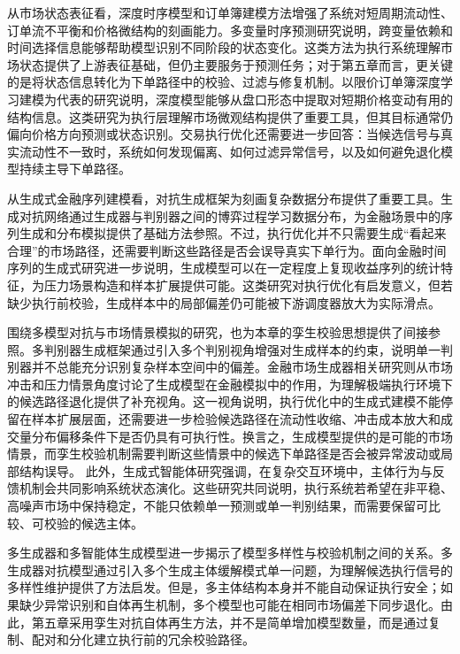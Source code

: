 从市场状态表征看，深度时序模型和订单簿建模方法增强了系统对短周期流动性、订单流不平衡和价格微结构的刻画能力。多变量时序预测研究说明，跨变量依赖和时间选择信息能够帮助模型识别不同阶段的状态变化\cite{lim2021temporal}。这类方法为执行系统理解市场状态提供了上游表征基础，但仍主要服务于预测任务；对于第五章而言，更关键的是将状态信息转化为下单路径中的校验、过滤与修复机制。以限价订单簿深度学习建模为代表的研究说明，深度模型能够从盘口形态中提取对短期价格变动有用的结构信息\cite{zhang2019DeepLOB}。这类研究为执行层理解市场微观结构提供了重要工具，但其目标通常仍偏向价格方向预测或状态识别。交易执行优化还需要进一步回答：当候选信号与真实流动性不一致时，系统如何发现偏离、如何过滤异常信号，以及如何避免退化模型持续主导下单路径。

从生成式金融序列建模看，对抗生成框架为刻画复杂数据分布提供了重要工具。生成对抗网络通过生成器与判别器之间的博弈过程学习数据分布，为金融场景中的序列生成和分布模拟提供了基础方法参照\cite{goodfellow2014generative}。不过，执行优化并不只需要生成“看起来合理”的市场路径，还需要判断这些路径是否会误导真实下单行为。面向金融时间序列的生成式研究进一步说明，生成模型可以在一定程度上复现收益序列的统计特征，为压力场景构造和样本扩展提供可能\cite{wiese2020quant}。这类研究对执行优化有启发意义，但若缺少执行前校验，生成样本中的局部偏差仍可能被下游调度器放大为实际滑点。

围绕多模型对抗与市场情景模拟的研究，也为本章的孪生校验思想提供了间接参照。多判别器生成框架通过引入多个判别视角增强对生成样本的约束，说明单一判别器并不总能充分识别复杂样本空间中的偏差\cite{nguyen2017dual}。金融市场生成器相关研究则从市场冲击和压力情景角度讨论了生成模型在金融模拟中的作用，为理解极端执行环境下的候选路径退化提供了补充视角\cite{kondratyev2019market}。这一视角说明，执行优化中的生成式建模不能停留在样本扩展层面，还需要进一步检验候选路径在流动性收缩、冲击成本放大和成交量分布偏移条件下是否仍具有可执行性。换言之，生成模型提供的是可能的市场情景，而孪生校验机制需要判断这些情景中的候选下单路径是否会被异常波动或局部结构误导。
此外，生成式智能体研究强调，在复杂交互环境中，主体行为与反馈机制会共同影响系统状态演化\cite{santoro2022generative}。这些研究共同说明，执行系统若希望在非平稳、高噪声市场中保持稳定，不能只依赖单一预测或单一判别结果，而需要保留可比较、可校验的候选主体。

多生成器和多智能体生成模型进一步揭示了模型多样性与校验机制之间的关系。多生成器对抗模型通过引入多个生成主体缓解模式单一问题，为理解候选执行信号的多样性维护提供了方法启发\cite{madgan2018multiagent}。但是，多主体结构本身并不能自动保证执行安全；如果缺少异常识别和自体再生机制，多个模型也可能在相同市场偏差下同步退化。由此，第五章采用孪生对抗自体再生方法，并不是简单增加模型数量，而是通过复制、配对和分化建立执行前的冗余校验路径。

